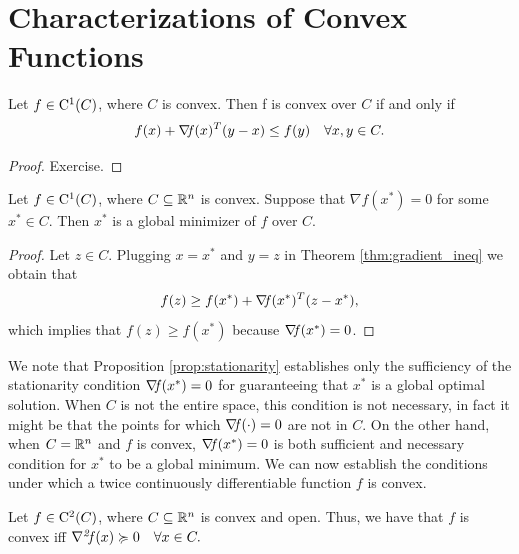 \documentclass[10pt,a4paper]{article}
\begin{document}
\section{Characterizations of Convex Functions}
\begin{theorem}\label{thm:gradient_ineq}
	Let $f\in \mathord{\mathrm{C^1}}(C)$, where $C$ is convex. Then f is convex over $C$ if and only if
	\begin{equation}\label{eq:grad_ineq}
		f(x) +\operatorname*{\mathit{\nabla \!f}}(x)^T(y-x)\leq f(y) \quad \forall x, y\in C.
	\end{equation}
\end{theorem}
\begin{proof}
	Exercise.
\end{proof}
\begin{proposition}\label{prop:stationarity}
	Let $f\in \mathord{\mathrm{C^1}}(C)$, where $C\subseteq\mathbb{R}^n$ is convex. Suppose that $\nabla f(x^*)=0$ for some $x^*\in C$. Then $x^*$ is a global minimizer of $f$ over $C$.
\end{proposition}
\begin{proof}
	Let $z\in C$. Plugging $x=x^*$ and $y=z$ in Theorem \ref{thm:gradient_ineq} we obtain that 
	\begin{equation*}
		f(z)\geq f(x^*) +\operatorname*{\mathit{\nabla \!f}}(x^*)^T(z-x^*),
	\end{equation*}
which implies that $f(z)\geq f(x^*) $ because $\operatorname*{\mathit{\nabla \!f}}(x^*)=0$.
\end{proof}
We note that Proposition \ref{prop:stationarity} establishes only the sufficiency of the stationarity condition $\operatorname*{\mathit{\nabla \!f}}(x^*) = 0$ for guaranteeing that $x^*$ is a global optimal solution. When $C$ is not the
entire space, this condition is not necessary, in fact it might be that the points for which $\operatorname*{\mathit{\nabla \!f}}(\cdot)=0$ are not in $C$. On the other hand, when $C=\mathbb{R}^n$ and $f$ is convex, $\operatorname*{\mathit{\nabla \!f}}(x^*) = 0$ is both sufficient and necessary condition for $x^*$ to be a global minimum.
We can now establish the conditions under which a twice continuously differentiable function $f$ is convex.
\begin{theorem}
	Let $f\in \mathord{\mathrm{C^2}}(C)$, where $C\subseteq\mathbb{R}^n$ is convex and open. Thus, we have that $f$ is convex iff $\operatorname*{\mathit{\nabla^2 \!f}}(x)\succcurlyeq0\quad \forall x\in C.$
\end{theorem}
\end{document}

